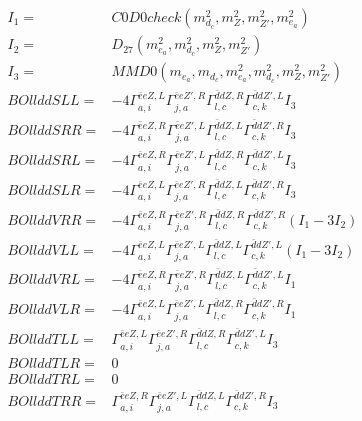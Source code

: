 \documentclass[A4,landscape]{article}
\begin{document}
\begin{align} 
I_1 = & C0D0check(m^2_{d_{{c}}}, m^2_{Z}, m^2_{{Z'}}, m^2_{e_{{a}}}) \\ 
I_2 = & D_{27}(m^2_{e_{{a}}}, m^2_{d_{{c}}}, m^2_{Z}, m^2_{{Z'}}) \\ 
I_3 = & MMD0(m_{e_{{a}}}, m_{d_{{c}}}, m^2_{e_{{a}}}, m^2_{d_{{c}}}, m^2_{Z}, m^2_{{Z'}}) \\ 
  BOllddSLL= & -4  \Gamma^{\bar{e}e Z ,L}_{a, i} \Gamma^{\bar{e}e {Z'} ,R}_{j, a} \Gamma^{\bar{d}d Z ,R}_{l, c} \Gamma^{\bar{d}d {Z'} ,L}_{c, k} I_3 \\ 
  BOllddSRR= & -4  \Gamma^{\bar{e}e Z ,R}_{a, i} \Gamma^{\bar{e}e {Z'} ,L}_{j, a} \Gamma^{\bar{d}d Z ,L}_{l, c} \Gamma^{\bar{d}d {Z'} ,R}_{c, k} I_3 \\ 
  BOllddSRL= & -4  \Gamma^{\bar{e}e Z ,R}_{a, i} \Gamma^{\bar{e}e {Z'} ,L}_{j, a} \Gamma^{\bar{d}d Z ,R}_{l, c} \Gamma^{\bar{d}d {Z'} ,L}_{c, k} I_3 \\ 
  BOllddSLR= & -4  \Gamma^{\bar{e}e Z ,L}_{a, i} \Gamma^{\bar{e}e {Z'} ,R}_{j, a} \Gamma^{\bar{d}d Z ,L}_{l, c} \Gamma^{\bar{d}d {Z'} ,R}_{c, k} I_3 \\ 
  BOllddVRR= & -4  \Gamma^{\bar{e}e Z ,R}_{a, i} \Gamma^{\bar{e}e {Z'} ,R}_{j, a} \Gamma^{\bar{d}d Z ,R}_{l, c} \Gamma^{\bar{d}d {Z'} ,R}_{c, k} (I_1 - 3 I_2) \\ 
  BOllddVLL= & -4  \Gamma^{\bar{e}e Z ,L}_{a, i} \Gamma^{\bar{e}e {Z'} ,L}_{j, a} \Gamma^{\bar{d}d Z ,L}_{l, c} \Gamma^{\bar{d}d {Z'} ,L}_{c, k} (I_1 - 3 I_2) \\ 
  BOllddVRL= & -4  \Gamma^{\bar{e}e Z ,R}_{a, i} \Gamma^{\bar{e}e {Z'} ,R}_{j, a} \Gamma^{\bar{d}d Z ,L}_{l, c} \Gamma^{\bar{d}d {Z'} ,L}_{c, k} I_1 \\ 
  BOllddVLR= & -4  \Gamma^{\bar{e}e Z ,L}_{a, i} \Gamma^{\bar{e}e {Z'} ,L}_{j, a} \Gamma^{\bar{d}d Z ,R}_{l, c} \Gamma^{\bar{d}d {Z'} ,R}_{c, k} I_1 \\ 
  BOllddTLL= &  \Gamma^{\bar{e}e Z ,L}_{a, i} \Gamma^{\bar{e}e {Z'} ,R}_{j, a} \Gamma^{\bar{d}d Z ,R}_{l, c} \Gamma^{\bar{d}d {Z'} ,L}_{c, k} I_3 \\ 
  BOllddTLR= & 0 \\ 
  BOllddTRL= & 0 \\ 
  BOllddTRR= &  \Gamma^{\bar{e}e Z ,R}_{a, i} \Gamma^{\bar{e}e {Z'} ,L}_{j, a} \Gamma^{\bar{d}d Z ,L}_{l, c} \Gamma^{\bar{d}d {Z'} ,R}_{c, k} I_3 \\ 
\end{align} 
\end{document}
